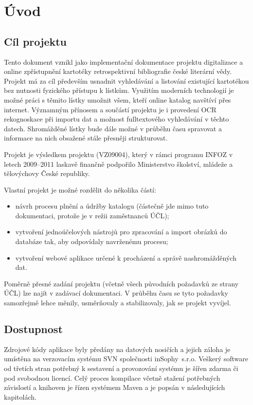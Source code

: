 \chapter{Úvod}

\section{Cíl projektu}

Tento dokument vznikl jako implementační dokumentace projektu digitalizace a online zpřístupnění kartotéky retrospektivní bibliografie české literární vědy. Projekt má za cíl především usnadnit vyhledávání a listování existující kartotékou bez nutnosti fyzického přístupu k lístkům. Využitím moderních technologií je možné práci s těmito lístky umožnit všem, kteří online katalog navštíví přes internet. Významným přínosem a součástí projektu je i provedení OCR rekognoskace při importu dat a možnost fulltextového vyhledávání v těchto datech. Shromážděné lístky bude dále možné v průběhu času spravovat a informace na nich obsažené stále přesněji strukturovat.

Projekt je výsledkem projektu  (VZ09004), který v rámci programu INFOZ v letech 2009--2011 laskavě finančně podpořilo Ministerstvo školství, mládeže a tělovýchovy České republiky.

Vlastní projekt je možné rozdělit do několika částí:

\begin{itemize}
\item{návrh procesu plnění a údržby katalogu (částečně jde mimo tuto dokumentaci, protože je v režii zaměstnanců ÚČL);}
\item{vytvoření jednoúčelových nástrojů pro zpracování a import obrázků do databáze tak, aby odpovídaly navrženému procesu;}
\item{vytvoření webové aplikace určené k procházení a správě nashromážděných dat.}
\end{itemize}

Poměrně přesné zadání projektu (včetně všech původních požadavků ze strany ÚČL) lze najít v zadávací dokumentaci. V průběhu času se tyto požadavky samozřejmě lehce měnily, usměrňovaly a stabilizovaly, jak se projekt vyvíjel.

\section{Dostupnost}

Zdrojové kódy aplikace byly předány na datových nosičích a jejich záloha je umístěna na verzovacím systému SVN společnosti inSophy~s.r.o. Veškerý software od třetích stran potřebný k sestavení a provozování systému je šířen zdarma či pod svobodnou licencí. Celý proces kompilace včetně stažení potřebných závislostí a knihoven je řízen systémem Maven a je popsán v následujících kapitolách.
